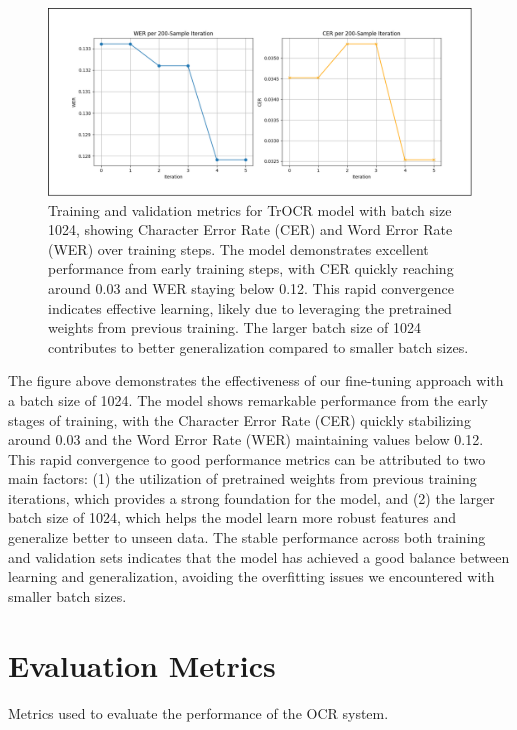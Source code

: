 \begin{figure}[H]
    \centering
    \includegraphics[width=\textwidth]{figures/trocr_fine_tuning.png}
    \caption{Training and validation metrics for TrOCR model with batch size 1024, 
    showing Character Error Rate (CER) and Word Error Rate (WER) over training steps. 
    The model demonstrates excellent performance from early training steps, with CER quickly 
    reaching around 0.03 and WER staying below 0.12. This rapid convergence indicates effective 
    learning, likely due to leveraging the pretrained weights from previous training. 
    The larger batch size of 1024 contributes to better generalization compared to smaller batch sizes.}
    \label{fig:trocr-fine-tuning}
\end{figure}

The figure above demonstrates the effectiveness of our fine-tuning approach with a batch size of 1024. 
The model shows remarkable performance from the early stages of training, with the Character 
Error Rate (CER) quickly stabilizing around 0.03 and the Word Error Rate (WER) maintaining 
values below 0.12. This rapid convergence to good performance metrics can be attributed to 
two main factors: (1) the utilization of pretrained weights from previous training iterations, 
which provides a strong foundation for the model, and (2) the larger batch size of 1024, which 
helps the model learn more robust features and generalize better to unseen data. The stable 
performance across both training and validation sets indicates that the model has achieved a 
good balance between learning and generalization, avoiding the overfitting issues we 
encountered with smaller batch sizes.


\section{Evaluation Metrics}
\label{sec:metrics}
Metrics used to evaluate the performance of the OCR system.

